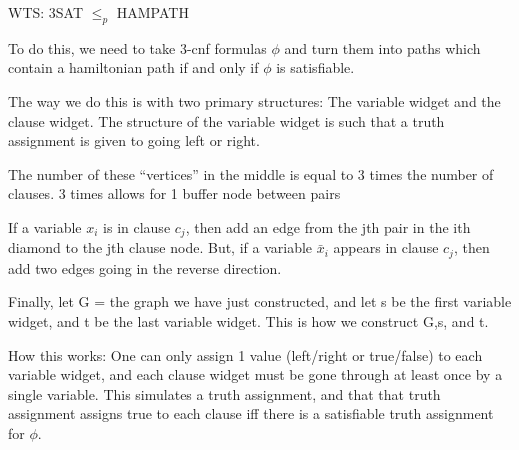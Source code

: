 WTS: 3SAT $\leq_p$ HAMPATH


To do this, we need to take 3-cnf formulas $\phi$ and turn them into paths which contain a hamiltonian path if and only if $\phi$ is satisfiable.


The way we do this is with two primary structures: The variable widget and the clause widget. The structure of the variable widget is such that a truth assignment is given to going left or right. 




The number of these ``vertices'' in the middle is equal to 3 times the number of clauses. 3 times allows for 1 buffer node between pairs 

If a variable $x_i$ is in clause $c_j$, then add an edge from the jth pair in the ith diamond to the jth clause node. But, if a variable $\bar x_i$ appears in clause $c_j$, then add two edges going in the reverse direction.

Finally, let G = the graph we have just constructed, and let s be the first variable widget, and t be the last variable widget. This is how we construct G,s, and t. 

How this works: One can only assign 1 value (left/right or true/false) to each variable widget, and each clause widget must be gone through at least once by a single variable. This simulates a truth assignment, and that that truth assignment assigns true to each clause iff there is a satisfiable truth assignment for $\phi$. 


